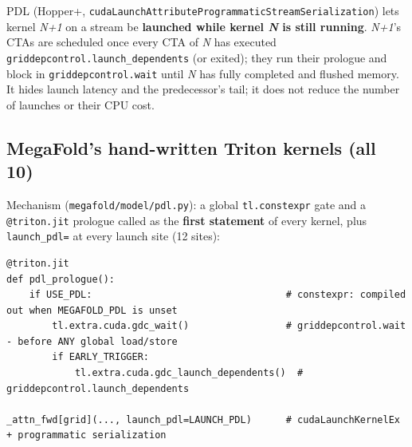 \documentclass[10pt]{article}
\begin{document}
PDL (Hopper+, \texttt{cudaLaunchAttributeProgrammaticStreamSerialization}) lets kernel \emph{N+1} on a stream be \textbf{launched while kernel \emph{N} is still running}. \emph{N+1}'s CTAs are scheduled once every CTA of \emph{N} has executed \texttt{griddepcontrol.launch\_dependents} (or exited); they run their prologue and block in \texttt{griddepcontrol.wait} until \emph{N} has fully completed and flushed memory. It hides launch latency and the predecessor's tail; it does not reduce the number of launches or their CPU cost.


\subsection{MegaFold's hand-written Triton kernels (all 10)}

Mechanism (\texttt{megafold/model/pdl.py}): a global \texttt{tl.constexpr} gate and a \texttt{@triton.jit} prologue called as the \textbf{first statement} of every kernel, plus \texttt{launch\_pdl=} at every launch site (12 sites):


\begin{lstlisting}
@triton.jit
def pdl_prologue():
    if USE_PDL:                                  # constexpr: compiled out when MEGAFOLD_PDL is unset
        tl.extra.cuda.gdc_wait()                 # griddepcontrol.wait  - before ANY global load/store
        if EARLY_TRIGGER:
            tl.extra.cuda.gdc_launch_dependents()  # griddepcontrol.launch_dependents

_attn_fwd[grid](..., launch_pdl=LAUNCH_PDL)      # cudaLaunchKernelEx + programmatic serialization
\end{lstlisting}
\end{document}
